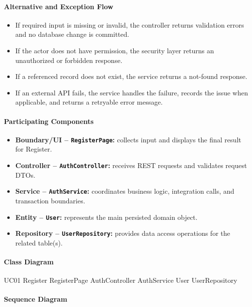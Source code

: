 \paragraph{Alternative and Exception Flow}

\begin{itemize}
    \item If required input is missing or invalid, the controller returns validation errors and no database change is committed.
    \item If the actor does not have permission, the security layer returns an unauthorized or forbidden response.
    \item If a referenced record does not exist, the service returns a not-found response.
    \item If an external API fails, the service handles the failure, records the issue when applicable, and returns a retryable error message.
\end{itemize}

\paragraph{Participating Components}

\begin{itemize}
    \item \textbf{Boundary/UI -- \texttt{RegisterPage}:} collects input and displays the final result for Register.
    \item \textbf{Controller -- \texttt{AuthController}:} receives REST requests and validates request DTOs.
    \item \textbf{Service -- \texttt{AuthService}:} coordinates business logic, integration calls, and transaction boundaries.
    \item \textbf{Entity -- \texttt{User}:} represents the main persisted domain object.
    \item \textbf{Repository -- \texttt{UserRepository}:} provides data access operations for the related table(s).
\end{itemize}

\paragraph{Class Diagram}

\ClassDiagram
{UC01 Register}
{RegisterPage}
{AuthController}
{AuthService}
{User}
{UserRepository}

\paragraph{Sequence Diagram}

